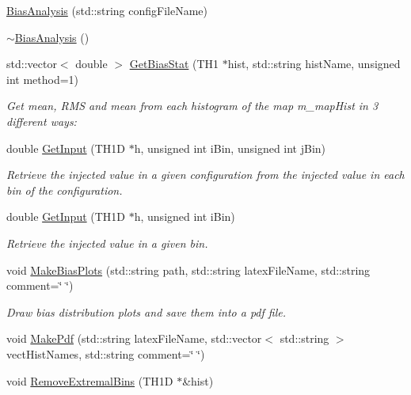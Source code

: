 \begin{DoxyCompactItemize}
\item 
\hyperlink{classBiasAnalysis_a98577873df587bf30d78c6d6219c94d5}{Bias\+Analysis} (std\+::string config\+File\+Name)
\item 
\hyperlink{classBiasAnalysis_a555ca9c2f77ca83c8ba26295d570566d}{$\sim$\+Bias\+Analysis} ()
\item 
std\+::vector$<$ double $>$ \hyperlink{classBiasAnalysis_a56a695c4c739371428de1a6c9c0039eb}{Get\+Bias\+Stat} (T\+H1 $\ast$hist, std\+::string hist\+Name, unsigned int method=1)
\begin{DoxyCompactList}\small\item\em Get mean, R\+M\+S and mean from each histogram of the map m\+\_\+map\+Hist in 3 different ways\+: \end{DoxyCompactList}\item 
double \hyperlink{classBiasAnalysis_a2a1b5f0f7fa4b281d1dad9ba124fe3f4}{Get\+Input} (T\+H1\+D $\ast$h, unsigned int i\+Bin, unsigned int j\+Bin)
\begin{DoxyCompactList}\small\item\em Retrieve the injected value in a given configuration from the injected value in each bin of the configuration. \end{DoxyCompactList}\item 
double \hyperlink{classBiasAnalysis_a61defea4e1cfd21d5cf2f7e10c8337a9}{Get\+Input} (T\+H1\+D $\ast$h, unsigned int i\+Bin)
\begin{DoxyCompactList}\small\item\em Retrieve the injected value in a given bin. \end{DoxyCompactList}\item 
void \hyperlink{classBiasAnalysis_a2ccb521f462c9cdf80ac1f353383ef16}{Make\+Bias\+Plots} (std\+::string path, std\+::string latex\+File\+Name, std\+::string comment=\char`\"{} \char`\"{})
\begin{DoxyCompactList}\small\item\em Draw bias distribution plots and save them into a pdf file. \end{DoxyCompactList}\item 
void \hyperlink{classBiasAnalysis_ae8f92b0e686c150a046aafebeee2a099}{Make\+Pdf} (std\+::string latex\+File\+Name, std\+::vector$<$ std\+::string $>$ vect\+Hist\+Names, std\+::string comment=\char`\"{} \char`\"{})
\item 
void \hyperlink{classBiasAnalysis_aaf3df3d94b8fc3b95aefd9866b2c022b}{Remove\+Extremal\+Bins} (T\+H1\+D $\ast$\&hist)

\end{DoxyCompactItemize}
